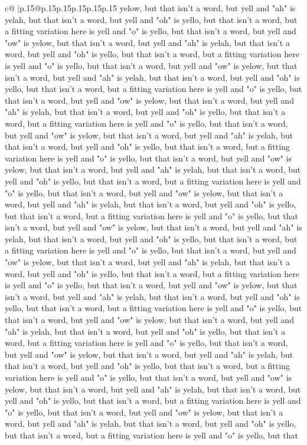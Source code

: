 \documentclass{article}
\begin{document}
{\begin{supertabular}{c@{$\;$}|p{.15\linewidth}@{}p{.15\linewidth}p{.15\linewidth}p{.15\linewidth}p{.15\linewidth}p{.15\linewidth}}
{{{yelow, but that isn't a word, but yell and "ah" is yelah, but that isn't a word, but yell and "oh" is yello, but that isn't a word, but a fitting variation here is yell and "o" is yello, but that isn't a word, but yell and "ow" is yelow, but that isn't a word, but yell and "ah" is yelah, but that isn't a word, but yell and "oh" is yello, but that isn't a word, but a fitting variation here is yell and "o" is yello, but that isn't a word, but yell and "ow" is yelow, but that isn't a word, but yell and "ah" is yelah, but that isn't a word, but yell and "oh" is yello, but that isn't a word, but a fitting variation here is yell and "o" is yello, but that isn't a word, but yell and "ow" is yelow, but that isn't a word, but yell and "ah" is yelah, but that isn't a word, but yell and "oh" is yello, but that isn't a word, but a fitting variation here is yell and "o" is yello, but that isn't a word, but yell and "ow" is yelow, but that isn't a word, but yell and "ah" is yelah, but that isn't a word, but yell and "oh" is yello, but that isn't a word, but a fitting variation here is yell and "o" is yello, but that isn't a word, but yell and "ow" is yelow, but that isn't a word, but yell and "ah" is yelah, but that isn't a word, but yell and "oh" is yello, but that isn't a word, but a fitting variation here is yell and "o" is yello, but that isn't a word, but yell and "ow" is yelow, but that isn't a word, but yell and "ah" is yelah, but that isn't a word, but yell and "oh" is yello, but that isn't a word, but a fitting variation here is yell and "o" is yello, but that isn't a word, but yell and "ow" is yelow, but that isn't a word, but yell and "ah" is yelah, but that isn't a word, but yell and "oh" is yello, but that isn't a word, but a fitting variation here is yell and "o" is yello, but that isn't a word, but yell and "ow" is yelow, but that isn't a word, but yell and "ah" is yelah, but that isn't a word, but yell and "oh" is yello, but that isn't a word, but a fitting variation here is yell and "o" is yello, but that isn't a word, but yell and "ow" is yelow, but that isn't a word, but yell and "ah" is yelah, but that isn't a word, but yell and "oh" is yello, but that isn't a word, but a fitting variation here is yell and "o" is yello, but that isn't a word, but yell and "ow" is yelow, but that isn't a word, but yell and "ah" is yelah, but that isn't a word, but yell and "oh" is yello, but that isn't a word, but a fitting variation here is yell and "o" is yello, but that isn't a word, but yell and "ow" is yelow, but that isn't a word, but yell and "ah" is yelah, but that isn't a word, but yell and "oh" is yello, but that isn't a word, but a fitting variation here is yell and "o" is yello, but that isn't a word, but yell and "ow" is yelow, but that isn't a word, but yell and "ah" is yelah, but that isn't a word, but yell and "oh" is yello, but that isn't a word, but a fitting variation here is yell and "o" is yello, but that isn't a word, but yell and "ow" is yelow, but that isn't a word, but yell and "ah" is yelah, but that isn't a word, but yell and "oh" is yello, but that isn't a word, but a fitting variation here is yell and "o" is yello, but that }}}
\end{supertabular}}
\end{document}
